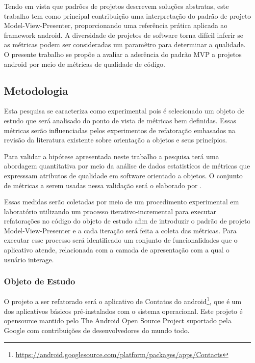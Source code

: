 \documentclass[conference]{IEEEtran}
\begin{document}
Tendo em vista que padrões de projetos descrevem soluções abstratas, este
trabalho tem como principal contribuição uma interpretação do padrão de projeto
Model-View-Presenter, proporcionando uma referência prática aplicada ao
framework android. A diversidade de projetos de software torna difícil inferir
se as métricas podem ser consideradas um paramêtro para determinar a qualidade.
O presente trabalho se propõe a avaliar a aderência do padrão MVP a projetos
android por meio de métricas de qualidade de código.

\subsection{Metodologia}

Esta pesquisa se caracteriza como experimental pois é selecionado um objeto
de estudo que será analisado do ponto de vista de métricas bem definidas. Essas
métricas serão influenciadas pelos experimentos de refatoração embasados na
revisão da literatura existente sobre orientação a objetos e seus princípios.

Para validar a hipótese apresentada neste trabalho a pesquisa terá uma
abordagem quantitativa por meio da análise de dados estatistícos de métricas 
que expresssam atributos de qualidade em software orientado a objetos. O
conjunto de métricas a serem usadas nessa validação será o elaborado por
.

Essas medidas serão coletadas por meio de um procedimento experimental em
laboratório utilizando um processo iterativo-incremental para executar
refatorações no código do objeto de estudo afim de introduzir o padrão de
projeto Model-View-Presenter e a cada iteração será feita a coleta das
métricas. Para executar esse processo será identificado um conjunto de
funcionalidades que o aplicativo atende, relacionada com a camada de
apresentação com a qual o usuário interage.

\subsubsection{Objeto de Estudo}


O projeto a ser refatorado será o aplicativo de Contatos do
android\footnote{\url{https://android.googlesource.com/platform/packages/apps/Contacts}},
que é um dos aplicativos básicos pré-instalados com o sistema operacional. Este
projeto é opensource mantido pelo  The Android Open Source Project suportado
pela Google com contribuições de desenvolvedores do mundo todo.
\end{document}

